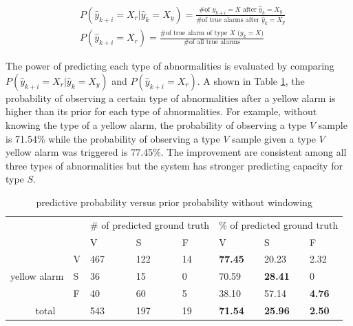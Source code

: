 \begin{align}
\nonumber 
&P(\hat{y}_{k+i}=X_r|\hat{y}_{k}=X_y)=\frac{\text{\# of $y_{k+i}=X$ after $\hat{y}_k=X_y$}}{\text{\# of true alarms after $\hat{y}_k=X_y$}} \\
&P(\hat{y}_{k+i}=X_r)=\frac{\text{\# of true alarm of type $X$ ($y_{k}=X$)}}{\text{\# of all true alarms}} 
\end{align}

The power of predicting each type of abnormalities is evaluated by comparing $P(\hat{y}_{k+i}=X_r|\hat{y}_{k}=X_y)$ and $P(\hat{y}_{k+i}=X_r)$. A shown in Table \ref{table:pred}, the probability of observing a certain type of abnormalities after a yellow alarm is higher than its prior for each type of abnormalities. For example, without knowing the type of a yellow alarm, the probability of observing a type $V$ sample is 71.54\% while the probability of observing a type $V$ sample given a type $V$ yellow alarm was triggered is 77.45\%. The improvement are consistent among all three types of abnormalities but the system has stronger predicting capacity for type $S$. 

\begin{table}[t]
\centering
\caption{predictive probability versus prior probability without windowing}
\label{table:pred}
\begin{tabular}{|c|l|l|l|l||l|l|l|}
\hline
\multicolumn{2}{|l|}{\multirow{2}{*}{}} & \multicolumn{3}{l|}{\# of predicted ground truth} & \multicolumn{3}{l|}{\% of predicted ground truth} \\ \cline{3-8} 
\multicolumn{2}{|l|}{}                  & V               & S               & F             & V               & S               & F             \\ \hline
\multirow{3}{*}{yellow alarm}    & V    & 467             & 122              & 14            & \textbf{77.45}  & 20.23           & 2.32          \\ \cline{2-8} 
                                 & S    & 36              & 15              & 0             & 70.59           & \textbf{28.41}  & 0             \\ \cline{2-8} 
                                 & F    & 40              & 60              & 5             & 38.10           & 57.14           & \textbf{4.76} \\ \hline
\multicolumn{2}{|c|}{total}             & 543             & 197             & 19            & \textbf{71.54}  & \textbf{25.96}  & \textbf{2.50} \\ \hline
\end{tabular}
\end{table}

